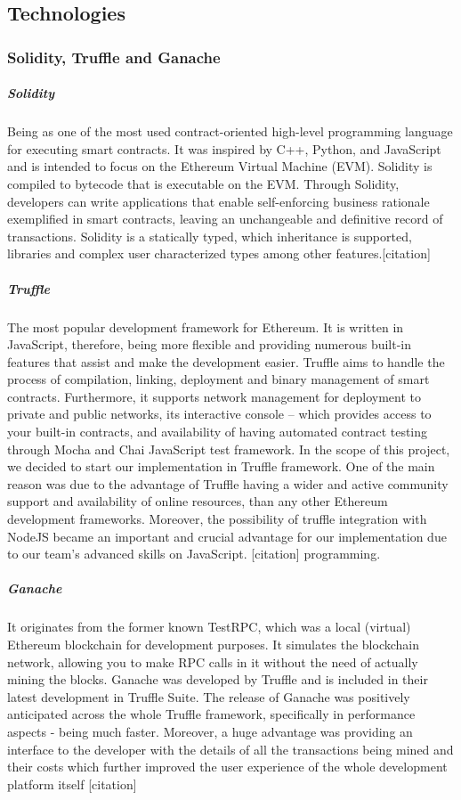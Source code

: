 \subsection{Technologies} \label{sssec:technologies}


\subsubsection{Solidity, Truffle and Ganache}

\subparagraph{Solidity}
Being as one of the most used contract-oriented high-level programming language for executing smart contracts. It was inspired by C++, Python, and JavaScript and is intended to focus on the Ethereum Virtual Machine (EVM). Solidity is compiled to bytecode that is executable on the EVM. Through Solidity, developers can write applications that enable self-enforcing business rationale exemplified in smart contracts, leaving an unchangeable and definitive record of transactions. Solidity is a statically typed, which inheritance is supported, libraries and complex user characterized types among other features.[citation]

\subparagraph{Truffle}
The most popular development framework for Ethereum. It is written in JavaScript, therefore, being more flexible and providing numerous built-in features that assist and make the development easier. Truffle aims to handle the process of compilation, linking, deployment and binary management of smart contracts. Furthermore, it supports network management for deployment to private and public networks, its interactive console – which provides access to your built-in contracts, and availability of having automated contract testing through Mocha and Chai JavaScript test framework. In the scope of this project, we decided to start our implementation in Truffle framework. One of the main reason was due to the advantage of Truffle having a wider and active community support and availability of online resources, than any other Ethereum development frameworks. Moreover, the possibility of truffle integration with NodeJS became an important and crucial advantage for our implementation due to our team’s advanced skills on JavaScript. [citation] programming.

\subparagraph{Ganache}
It originates from the former known TestRPC,  which was a local (virtual) Ethereum blockchain for development purposes. It simulates the blockchain network, allowing you to make RPC calls in it without the need of actually mining the blocks. Ganache was developed by Truffle and is included in their latest development in Truffle Suite. The release of Ganache was positively anticipated across the whole Truffle framework, specifically in performance aspects - being much faster. Moreover, a huge advantage was providing an interface to the developer with the details of all the transactions being mined and their costs which further improved the user experience of the whole development platform itself [citation]


